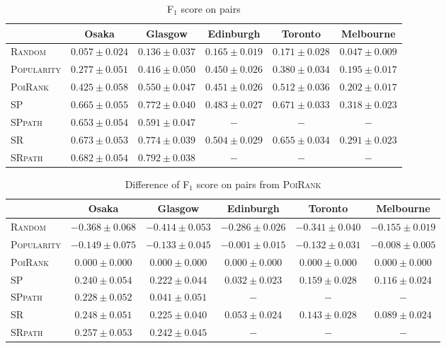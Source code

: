 \begin{table*}[t]
\caption{F$_1$ score on pairs}
\label{tab:pf1}
\centering
\begin{tabular}{l|ccccc} \hline
 & Osaka & Glasgow & Edinburgh & Toronto & Melbourne \\ \hline
\textsc{Random} & $0.057\pm0.024$ & $0.136\pm0.037$ & $0.165\pm0.019$ & $0.171\pm0.028$ & $0.047\pm0.009$ \\
\textsc{Popularity} & $0.277\pm0.051$ & $0.416\pm0.050$ & $0.450\pm0.026$ & $0.380\pm0.034$ & $0.195\pm0.017$ \\
\textsc{PoiRank} & $0.425\pm0.058$ & $0.550\pm0.047$ & $0.451\pm0.026$ & $0.512\pm0.036$ & $0.202\pm0.017$ \\
\textsc{SP} & $0.665\pm0.055$ & $0.772\pm0.040$ & $\mathit{0.483\pm0.027}$ & $\mathbf{0.671\pm0.033}$ & $\mathbf{0.318\pm0.023}$ \\
\textsc{SPpath} & $0.653\pm0.054$ & $0.591\pm0.047$ & $-$ & $-$ & $-$ \\
\textsc{SR} & $\mathit{0.673\pm0.053}$ & $\mathit{0.774\pm0.039}$ & $\mathbf{0.504\pm0.029}$ & $\mathit{0.655\pm0.034}$ & $\mathit{0.291\pm0.023}$ \\
\textsc{SRpath} & $\mathbf{0.682\pm0.054}$ & $\mathbf{0.792\pm0.038}$ & $-$ & $-$ & $-$ \\
\hline
\end{tabular}
\end{table*}

\begin{table*}[t]
\caption{Difference of F$_1$ score on pairs from \textsc{PoiRank}}
\label{tab:dpf1}
\centering
\begin{tabular}{l|ccccc} \hline
 & Osaka & Glasgow & Edinburgh & Toronto & Melbourne \\ \hline
\textsc{Random} & $-0.368\pm0.068$ & $-0.414\pm0.053$ & $-0.286\pm0.026$ & $-0.341\pm0.040$ & $-0.155\pm0.019$ \\
\textsc{Popularity} & $-0.149\pm0.075$ & $-0.133\pm0.045$ & $-0.001\pm0.015$ & $-0.132\pm0.031$ & $-0.008\pm0.005$ \\
\textsc{PoiRank} & $0.000\pm0.000$ & $0.000\pm0.000$ & $0.000\pm0.000$ & $0.000\pm0.000$ & $0.000\pm0.000$ \\
\textsc{SP} & $0.240\pm0.054$ & $0.222\pm0.044$ & $\mathit{0.032\pm0.023}$ & $\mathbf{0.159\pm0.028}$ & $\mathbf{0.116\pm0.024}$ \\
\textsc{SPpath} & $0.228\pm0.052$ & $0.041\pm0.051$ & $-$ & $-$ & $-$ \\
\textsc{SR} & $\mathit{0.248\pm0.051}$ & $\mathit{0.225\pm0.040}$ & $\mathbf{0.053\pm0.024}$ & $\mathit{0.143\pm0.028}$ & $\mathit{0.089\pm0.024}$ \\
\textsc{SRpath} & $\mathbf{0.257\pm0.053}$ & $\mathbf{0.242\pm0.045}$ & $-$ & $-$ & $-$ \\
\hline
\end{tabular}
\end{table*}

